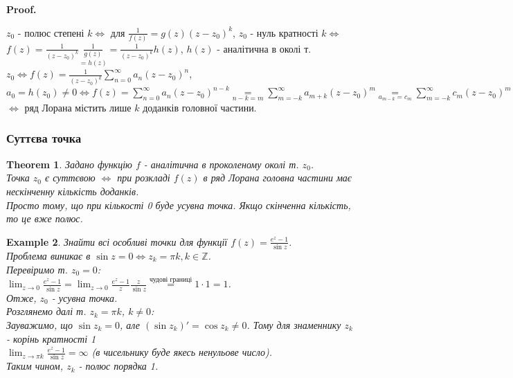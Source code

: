 \documentclass[a4paper, 10pt]{article}
\makeatletter
\def\qed{$\blacksquare$}
\theoremstyle{theoremdd}
\newtheorem{theorem}{Theorem}[subsection]
\theoremstyle{theoremdd}
\theoremstyle{theoremdd}
\theoremstyle{theoremdd}
\newtheorem{example}[theorem]{Example}
\theoremstyle{theoremdd}
\theoremstyle{theoremdd}
\theoremstyle{theoremdd}
\theoremstyle{theoremdd}
\renewenvironment{proof}[1][Proof.\\]{\par
\pushQED{\hfill \qed}%
\normalfont \topsep6\p@\@plus6\p@\relax
\trivlist
\item\relax
{\bfseries
#1\@addpunct{.}}\hspace\labelsep\ignorespaces
}{%
\popQED\endtrivlist\@endpefalse
}
\makeatother
\begin{document}
\begin{proof}
$z_0$ - полюс степені $k \iff$ для $\displaystyle \frac{1}{f(z)} = g(z)(z-z_0)^k$, $z_0$ - нуль кратності $k \iff$ $\displaystyle f(z)=\frac{1}{(z-z_0)^k} \underset{=h(z)}{\frac{1}{g(z)}} = \frac{1}{(z-z_0)^k} h(z)$, $h(z)$ - аналітична в околі т. $z_0 \iff \displaystyle f(z)=\frac{1}{(z-z_0)^k} \sum_{n=0}^{\infty}a_n(z-z_0)^n$, $a_0 = h(z_0) \neq 0 \iff \displaystyle f(z)=\sum_{n=0}^{\infty} a_n(z-z_0)^{n-k} \underset{n-k=m}{=} \sum_{m=-k}^{\infty} a_{m+k}(z-z_0)^{m} \underset{a_{m-k}=c_m}{=} \sum_{m=-k}^{\infty} c_m (z-z_0)^{m}$ $\iff$ ряд Лорана містить лише $k$ доданків головної частини.
\end{proof}


\subsubsection{Суттєва точка}
\begin{theorem}
Задано функцію $f$ - аналітична в проколеному околі т. $z_0$.\\
Точка $z_0$ є суттєвою $\iff$ при розкладі $f(z)$ в ряд Лорана головна частини має нескінченну кількість доданків.\\
\textit{Просто тому, що при кількості 0 буде усувна точка. Якщо скінченна кількість, то це вже полюс.}
\end{theorem}

\begin{example}
Знайти всі особливі точки для функції $\displaystyle f(z) = \frac{e^z-1}{\sin z}$.\\
Проблема виникає в $\sin z = 0 \iff z_k = \pi k, k \in \mathbb{Z}$.\\
Перевіримо т. $z_0 = 0$:\\
$\displaystyle \lim_{z \to 0} \frac{e^z-1}{\sin z} = \lim_{z \to 0} \frac{e^z-1}{z} \frac{z}{\sin z} \overset{\textrm{чудові границі}}{=} 1 \cdot 1 = 1$.\\
Отже, $z_0$ - усувна точка.\\
Розглянемо далі т. $z_{k} = \pi k$, $k \neq 0$:\\
Зауважимо, що $\sin z_k = 0$, але $(\sin z_k)' = \cos z_k \neq 0$. Тому для знаменнику $z_k$ - корінь кратності 1\\
$\displaystyle \lim_{z \to \pi k} \frac{e^z-1}{\sin z} = \infty$ (в чисельнику буде якесь ненульове число).\\
Таким чином, $z_k$ - полюс порядка 1.
\end{example}
\end{document}
